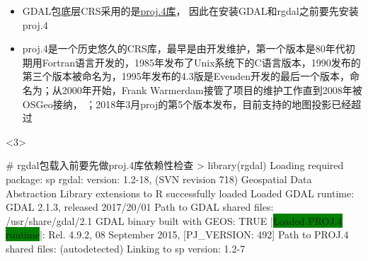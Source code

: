 \begin{frame}[t,fragile]{\subsecname}{\subsubsecname}
\begin{itemize}
\item<1-> GDAL包底层CRS采用的是\href{http://proj4.org/}{\uline{proj.4库}}，
因此在安装GDAL和rgdal之前要先安装proj.4
\item<2-> proj.4是一个历史悠久的CRS库，最早是由开发维护，第一个版本是80年代初期用Fortran语言开发的，1985年发布了Unix系统下的C语言版本，1990发布的
第三个版本被命名为，1995年发布的4.3版是Evenden开发的最后一个版本，命名为；从2000年开始，Frank Warmerdam接管了项目的维护工作直到2008年被OSGeo接纳，
；2018年3月proj的第5个版本发布，目前支持的地图投影已经超过
\end{itemize}

\begin{onlyenv}<3>
\begin{rcode}
# rgdal包载入前要先做proj.4库依赖性检查
> library(rgdal)
Loading required package: sp
rgdal: version: 1.2-18, (SVN revision 718)
 Geospatial Data Abstraction Library extensions to R successfully loaded
 Loaded GDAL runtime: GDAL 2.1.3, released 2017/20/01
 Path to GDAL shared files: /usr/share/gdal/2.1
 GDAL binary built with GEOS: TRUE 
 |\colorbox{green}{Loaded PROJ.4 runtime}|: Rel. 4.9.2, 08 September 2015, [PJ_VERSION: 492]
 Path to PROJ.4 shared files: (autodetected)
 Linking to sp version: 1.2-7 
\end{rcode}
\end{onlyenv}
\end{frame}

